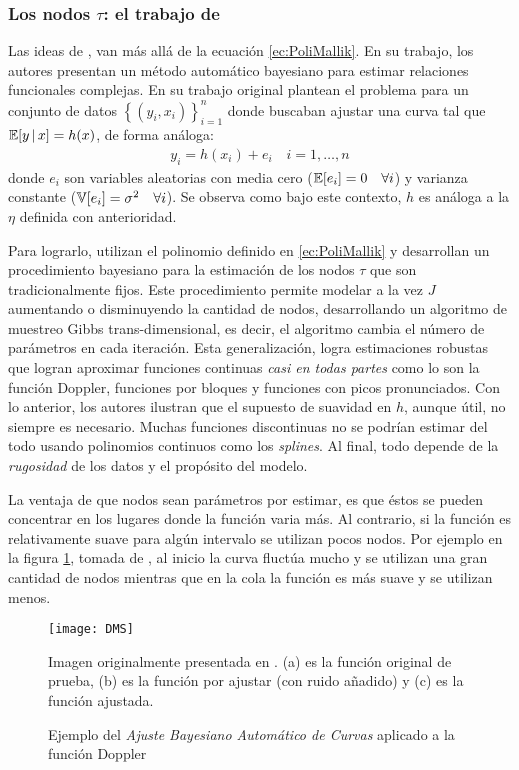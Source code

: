 \documentclass[../Main/Main.tex]{subfiles}
\begin{document}
\subsubsection*{Los nodos $\tau$: el trabajo de \citeauthor{mallik1998automatic}}
Las ideas de \citet{mallik1998automatic}, van más allá de la ecuación \eqref{ec:PoliMallik}. En su trabajo, los autores presentan un método automático bayesiano para estimar relaciones funcionales complejas. En su trabajo original plantean el problema para un conjunto de datos $\left\{(y_i,x_i) \right\}_{i = 1}^n$ donde buscaban ajustar una curva tal que $\mathbb{E}[y\,|\,x] = h(x)$, de forma análoga:
\begin{align}
	y_i = h(x_i) + e_i \quad i = 1,\ldots,n \label{ec:ModeloGral}
\end{align}
donde $e_i$ son variables aleatorias con media cero ($\mathbb{E}[e_i] = 0 \quad \forall i$) y varianza constante ($\mathbb{V}[e_i] = \sigma^2 \quad \forall i$).  Se observa como bajo este contexto, $h$ es análoga a la $\eta$ definida con anterioridad.

Para lograrlo, utilizan el polinomio definido en \eqref{ec:PoliMallik} y desarrollan un procedimiento bayesiano para la estimación de los nodos $\tau$ que son tradicionalmente fijos. Este procedimiento permite modelar a la vez $J$ aumentando o disminuyendo la cantidad de nodos, desarrollando un algoritmo de muestreo Gibbs trans-dimensional, es decir, el algoritmo cambia el número de parámetros en cada iteración. Esta generalización, logra estimaciones robustas que logran aproximar funciones continuas \textit{casi en todas partes} como lo son la función Doppler, funciones por bloques y funciones con picos pronunciados. Con lo anterior, los autores ilustran que el supuesto de suavidad en $h$, aunque útil, no siempre es necesario. Muchas funciones discontinuas no se podrían estimar del todo usando polinomios continuos como los \textit{splines}. Al final, todo depende de la \textit{rugosidad} de los datos y el propósito del modelo.

La ventaja de que nodos sean parámetros por estimar, es que éstos se pueden concentrar en los lugares donde la función varia más. Al contrario, si la función es relativamente suave para algún intervalo se utilizan pocos nodos.  Por ejemplo en la figura \ref{fig:DMS}, tomada de \citet{mallik1998automatic}, al inicio la curva fluctúa mucho y se utilizan una gran cantidad de nodos mientras que en la cola la función es más suave y se utilizan menos. 

\begin{figure}[p]
  \centering
      \begin{minipage}{.9\textwidth} %
		\texttt{[image: DMS]}
		{\footnotesize Imagen originalmente presentada en \citet{mallik1998automatic}. (a) es la función original de prueba, (b) es la función por ajustar (con ruido añadido) y (c) es la función ajustada. \par}
	\end{minipage}
  \caption{Ejemplo del \emph{Ajuste Bayesiano Automático de Curvas} aplicado a la función Doppler }
  \label{fig:DMS}
\end{figure}
\end{document}
